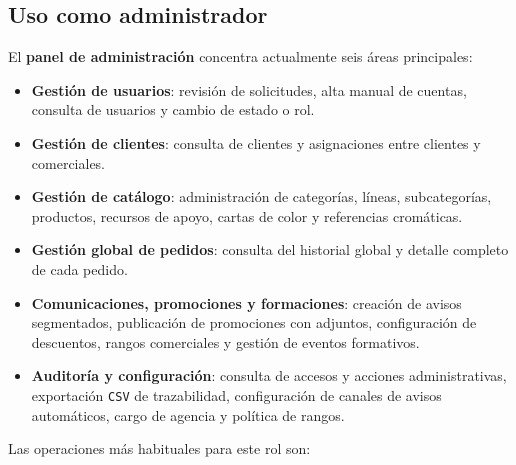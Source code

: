 \subsection{Uso como administrador}

El \textbf{panel de administración} concentra actualmente seis áreas principales:

\begin{itemize}
    \item \textbf{Gestión de usuarios}: revisión de solicitudes, alta manual de cuentas, consulta de usuarios y cambio de estado o rol.
    \item \textbf{Gestión de clientes}: consulta de clientes y asignaciones entre clientes y comerciales.
    \item \textbf{Gestión de catálogo}: administración de categorías, líneas, subcategorías, productos, recursos de apoyo, cartas de color y referencias cromáticas.
    \item \textbf{Gestión global de pedidos}: consulta del historial global y detalle completo de cada pedido.
    \item \textbf{Comunicaciones, promociones y formaciones}: creación de avisos segmentados, publicación de promociones con adjuntos, configuración de descuentos, rangos comerciales y gestión de eventos formativos.
    \item \textbf{Auditoría y configuración}: consulta de accesos y acciones administrativas, exportación \texttt{CSV} de trazabilidad, configuración de canales de avisos automáticos, cargo de agencia y política de rangos.
\end{itemize}

Las operaciones más habituales para este rol son:


